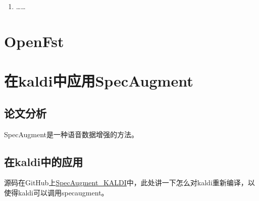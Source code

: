 \begin{enumerate}
\begin{lstlisting}
[ Stack-Trace: ]
kaldi::MessageLogger::LogMessage() const
kaldi::MessageLogger::LogAndThrow::operator=(kaldi::MessageLogger const&)
fst::ReadFstKaldi(std::string)
main
__libc_start_main
fstpushspecial() [0x401b99]
  \end{lstlisting}
  那么我们怎么来使用大的语言模型呢？可以先用小的语言模型参与解码，然后生成对应的lattice，再使用rescoring的方法利用大的语言模型来进行重新估计，解决步骤如下：
  \begin{enumerate}
      \item 使用 \textcolor{green}{utils/format\_lm.sh} 生成小语言模型的G.fst；
      \item 使用 \textcolor{green}{utils/format\_lm.sh} 生成大语言模型的G.fst；
      \item 使用 \textcolor{green}{utils/mkgraph.sh} 来逐步构图，生成HCLG.fst；
      \item 使用 \textcolor{green}{steps/online/nnet3/prepare\_online\_decoding.sh}来准备在线解码；
      \item 使用 \textcolor{green}{steps/online/nnet3/decode.sh}来进行在线解码生成lattice；
      \item 使用 \textcolor{green}{steps/lmrescore.sh} 来进行rescoring。切记{\bf 如果是chain model，在运行这条指令时要加上 "--self-loop-scale 1.0"}。
  \end{enumerate}
\item ……

\end{enumerate}

\section{OpenFst}


\section{在kaldi中应用SpecAugment}
\subsection{论文分析}
SpecAugment\cite{Park2019}是一种语音数据增强的方法。

\subsection{在kaldi中的应用}
源码在GitHub上\href{https://github.com/irebai/SpecAugment\_KALDI.git}{SpecAugment_KALDI}中，此处讲一下怎么对kaldi重新编译，以使得kaldi可以调用specaugment。

